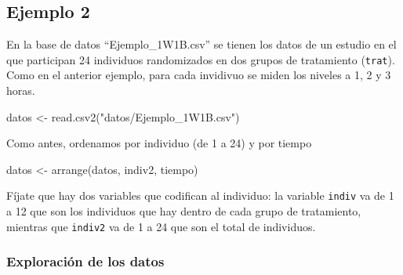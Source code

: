 \documentclass[
]{book}
\newenvironment{Shaded}{\begin{snugshade}}{\end{snugshade}}
\newcommand{\FunctionTok}[1]{\textcolor[rgb]{0.00,0.00,0.00}{#1}}
\newcommand{\NormalTok}[1]{#1}
\newcommand{\OtherTok}[1]{\textcolor[rgb]{0.56,0.35,0.01}{#1}}
\newcommand{\StringTok}[1]{\textcolor[rgb]{0.31,0.60,0.02}{#1}}
\begin{document}
\hypertarget{Ejemplo2}{%
\subsection{Ejemplo 2}\label{Ejemplo2}}

En la base de datos ``Ejemplo\_1W1B.csv'' se tienen los datos de un estudio en el que participan 24 individuos randomizados en dos grupos de tratamiento (\texttt{trat}). Como en el anterior ejemplo, para cada invidivuo se miden los niveles a 1, 2 y 3 horas.

\begin{Shaded}
\begin{Highlighting}[]
\NormalTok{datos }\OtherTok{\textless{}{-}} \FunctionTok{read.csv2}\NormalTok{(}\StringTok{"datos/Ejemplo\_1W1B.csv"}\NormalTok{)}
\end{Highlighting}
\end{Shaded}

Como antes, ordenamos por individuo (de 1 a 24) y por tiempo

\begin{Shaded}
\begin{Highlighting}[]
\NormalTok{datos }\OtherTok{\textless{}{-}} \FunctionTok{arrange}\NormalTok{(datos, indiv2, tiempo)}
\end{Highlighting}
\end{Shaded}

Fíjate que hay dos variables que codifican al individuo: la variable \texttt{indiv} va de 1 a 12 que son los individuos que hay dentro de cada grupo de tratamiento, mientras que \texttt{indiv2} va de 1 a 24 que son el total de individuos.

\hypertarget{exploraciuxf3n-de-los-datos-1}{%
\subsubsection{Exploración de los datos}\label{exploraciuxf3n-de-los-datos-1}}
\end{document}
